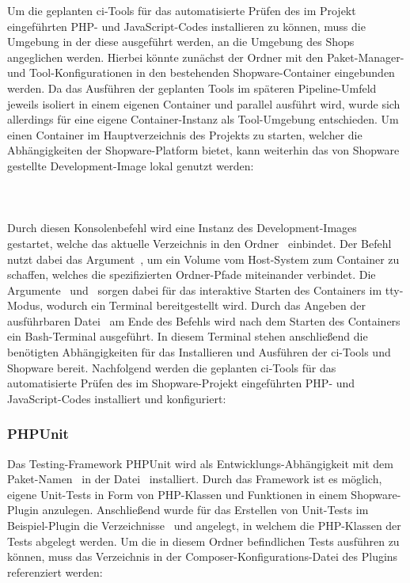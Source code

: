 Um die geplanten \acrshort{ci}-Tools für das automatisierte Prüfen des im Projekt eingeführten PHP- und JavaScript-Codes
installieren zu können, muss die Umgebung in der diese ausgeführt werden, an die Umgebung des Shops angeglichen werden.
Hierbei könnte zunächst der Ordner mit den Paket-Manager- und Tool-Konfigurationen in den bestehenden Shopware-Container
eingebunden werden.
Da das Ausführen der geplanten Tools im späteren Pipeline-Umfeld jeweils isoliert in einem eigenen Container und
parallel ausführt wird, wurde sich allerdings für eine eigene Container-Instanz als Tool-Umgebung entschieden.
Um einen Container im Hauptverzeichnis des Projekts zu starten, welcher die Abhängigkeiten der Shopware-Platform
bietet, kann weiterhin das von Shopware gestellte Development-Image lokal genutzt werden:
\\\\
\\\\
Durch diesen Konsolenbefehl wird eine Instanz des Development-Images gestartet, welche das aktuelle Verzeichnis in den
Ordner\  einbindet.
Der Befehl nutzt dabei das Argument\ , um ein Volume vom Host-System zum Container zu schaffen, welches
die spezifizierten Ordner-Pfade miteinander verbindet.
Die Argumente\  und\  sorgen dabei für das interaktive Starten des Containers im
\acrshort{tty}-Modus, wodurch ein Terminal bereitgestellt wird.
Durch das Angeben der ausführbaren Datei\  am Ende des Befehls wird nach dem Starten des
Containers ein Bash-Terminal ausgeführt.
In diesem Terminal stehen anschließend die benötigten Abhängigkeiten für das Installieren und Ausführen der
\acrshort{ci}-Tools und Shopware bereit.
Nachfolgend werden die geplanten \acrshort{ci}-Tools für das automatisierte Prüfen des im Shopware-Projekt eingeführten
PHP- und JavaScript-Codes installiert und konfiguriert:

\subsubsection{PHPUnit}


Das Testing-Framework PHPUnit wird als Entwicklungs-Abhängigkeit mit dem Paket-Namen\ 
in der Datei\  installiert.
Durch das Framework ist es möglich, eigene Unit-Tests in Form von PHP-Klassen und Funktionen in einem Shopware-Plugin
anzulegen.
Anschließend wurde für das Erstellen von Unit-Tests im Beispiel-Plugin die Verzeichnisse\  und
 angelegt, in welchem die PHP-Klassen der Tests abgelegt werden.
Um die in diesem Ordner befindlichen Tests ausführen zu können, muss das Verzeichnis in der
Composer-Konfigurations-Datei des Plugins referenziert werden:

